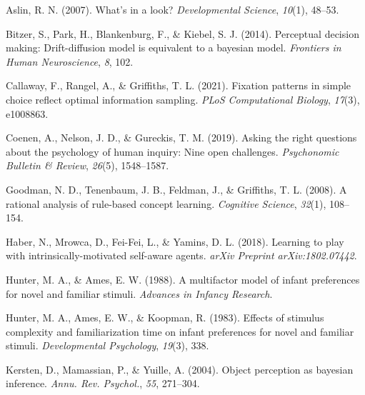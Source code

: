 \documentclass[10pt, letterpaper]{article}
\newenvironment{CSLReferences}%
  {}%
  {\par}
\begin{document}
\setlength{\parindent}{-0.1in} 
\setlength{\leftskip}{0.125in}

\noindent

\hypertarget{refs}{}
\begin{CSLReferences}{1}{0}
\leavevmode{}%
Aslin, R. N. (2007). What's in a look? \emph{Developmental Science},
\emph{10}(1), 48--53.

\leavevmode{}%
Bitzer, S., Park, H., Blankenburg, F., \& Kiebel, S. J. (2014).
Perceptual decision making: Drift-diffusion model is equivalent to a
bayesian model. \emph{Frontiers in Human Neuroscience}, \emph{8}, 102.

\leavevmode{}%
Callaway, F., Rangel, A., \& Griffiths, T. L. (2021). Fixation patterns
in simple choice reflect optimal information sampling. \emph{PLoS
Computational Biology}, \emph{17}(3), e1008863.

\leavevmode{}%
Coenen, A., Nelson, J. D., \& Gureckis, T. M. (2019). Asking the right
questions about the psychology of human inquiry: Nine open challenges.
\emph{Psychonomic Bulletin \& Review}, \emph{26}(5), 1548--1587.

\leavevmode{}%
Goodman, N. D., Tenenbaum, J. B., Feldman, J., \& Griffiths, T. L.
(2008). A rational analysis of rule-based concept learning.
\emph{Cognitive Science}, \emph{32}(1), 108--154.

\leavevmode{}%
Haber, N., Mrowca, D., Fei-Fei, L., \& Yamins, D. L. (2018). Learning to
play with intrinsically-motivated self-aware agents. \emph{arXiv
Preprint arXiv:1802.07442}.

\leavevmode{}%
Hunter, M. A., \& Ames, E. W. (1988). A multifactor model of infant
preferences for novel and familiar stimuli. \emph{Advances in Infancy
Research}.

\leavevmode{}%
Hunter, M. A., Ames, E. W., \& Koopman, R. (1983). Effects of stimulus
complexity and familiarization time on infant preferences for novel and
familiar stimuli. \emph{Developmental Psychology}, \emph{19}(3), 338.

\leavevmode{}%
Kersten, D., Mamassian, P., \& Yuille, A. (2004). Object perception as
bayesian inference. \emph{Annu. Rev. Psychol.}, \emph{55}, 271--304.


\end{CSLReferences}
\end{document}
